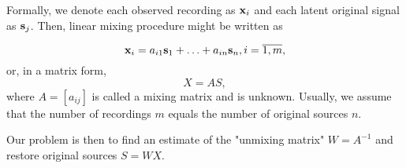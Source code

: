 \documentclass[../main.tex]{subfiles} %
\begin{document}
Formally, we denote  each observed recording as ${\mathbf x}_i$ and each latent original signal as ${\mathbf s}_j$. Then, linear mixing procedure might be written as 

\[ {\mathbf x}_i = a_{i1} {\mathbf s}_1 + \ldots + a_{in} {\mathbf s}_n, i = \overline{1, m}, \]
or, in a matrix form, 
\[ X = A S, \]
where $A = \left[a_{ij} \right]$ is called a mixing matrix and is unknown. Usually, we assume that the number of recordings $m$ equals the number of original sources $n$.

Our problem is then to find an estimate of the "unmixing matrix" $W = A^{-1}$  and restore original sources $S = W X$.
\end{document}
